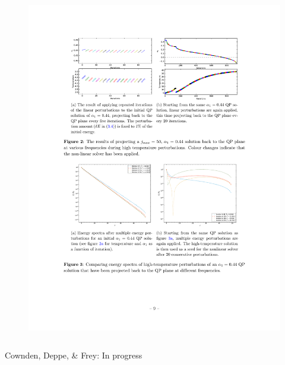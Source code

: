 \documentclass[mathserif,10pt]{beamer}
\newcommand{\scr}{\scriptsize}
\begin{document}
{{\begin{columns}
\begin{figure}
  \includegraphics[scale=0.75]{reop20}
  \end{figure}
  \end{columns}
  \begin{center}
  \vspace{-0.12in}
  {\scr Cownden, Deppe, \& Frey: In progress}
  \end{center}
  \vspace{-0.1in}
}

}
\end{document}
